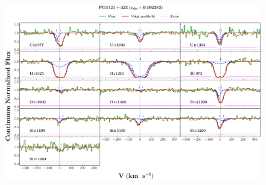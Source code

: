 \documentclass[12pt]{report}
\begin{document}
\newpage

\begin{landscape}

\begin{figure}
    \centering
    \vspace{-20mm}
    \hspace*{-35mm}
    \includegraphics[width=1.25\linewidth]{System-Plots/PG1121+422_z=0.192393_sys_plot.png}
\end{figure}

\end{landscape}
\end{document}
